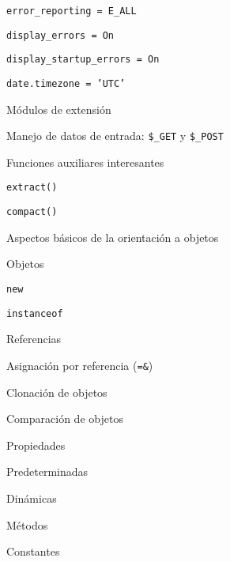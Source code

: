 \begin{longenum}
\begin{longenum}
\begin{longenum}
\begin{longenum}
                \item \texttt{error\_reporting = E\_ALL}
                \item \texttt{display\_errors = On}
                \item \texttt{display\_startup\_errors = On}
                \item \texttt{date.timezone = 'UTC'}
            \end{longenum}
            \item Módulos de extensión
        \end{longenum}
        \item Manejo de datos de entrada: \texttt{\$\_GET} y \texttt{\$\_POST}
        \item Funciones auxiliares interesantes
        \begin{longenum}
            \item \texttt{extract()}
            \item \texttt{compact()}
        \end{longenum}
        \item Aspectos básicos de la orientación a objetos
        \begin{longenum}
            \item Objetos
            \begin{longenum}
                \item \texttt{new}
                \item \texttt{instanceof}
            \end{longenum}
            \item Referencias
            \begin{longenum}
                \item Asignación por referencia (\texttt{=\&})
            \end{longenum}
            \item Clonación de objetos
            \item Comparación de objetos
            \item Propiedades
            \begin{longenum}
                \item Predeterminadas
                \item Dinámicas
            \end{longenum}
            \item Métodos
            \item Constantes
            \begin{longenum}

\end{longenum}
\end{longenum}
\end{longenum}
\end{longenum}
